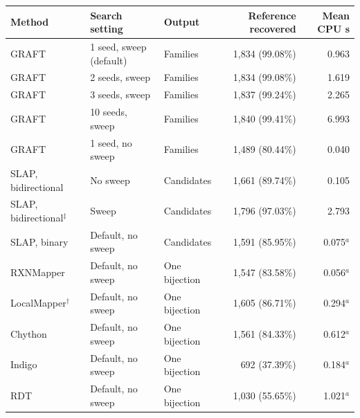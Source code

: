 \begin{tabular}{@{}lllr r@{}}\toprule
Method & Search setting & Output & Reference recovered & Mean CPU s\\\midrule
GRAFT & 1 seed, sweep (default) & Families & 1,834 (99.08\%) & 0.963 \\
GRAFT & 2 seeds, sweep & Families & 1,834 (99.08\%) & 1.619 \\
GRAFT & 3 seeds, sweep & Families & 1,837 (99.24\%) & 2.265 \\
GRAFT & 10 seeds, sweep & Families & 1,840 (99.41\%) & 6.993 \\
GRAFT & 1 seed, no sweep & Families & 1,489 (80.44\%) & 0.040 \\
SLAP, bidirectional & No sweep & Candidates & 1,661 (89.74\%) & 0.105 \\
SLAP, bidirectional$^{\ddagger}$ & Sweep & Candidates & 1,796 (97.03\%) & 2.793 \\
SLAP, binary & Default, no sweep & Candidates & 1,591 (85.95\%) & 0.075$^{a}$ \\
RXNMapper & Default, no sweep & One bijection & 1,547 (83.58\%) & 0.056$^{a}$ \\
LocalMapper$^{\dagger}$ & Default, no sweep & One bijection & 1,605 (86.71\%) & 0.294$^{a}$ \\
Chython & Default, no sweep & One bijection & 1,561 (84.33\%) & 0.612$^{a}$ \\
Indigo & Default, no sweep & One bijection & 692 (37.39\%) & 0.184$^{a}$ \\
RDT & Default, no sweep & One bijection & 1,030 (55.65\%) & 1.021$^{a}$ \\
\bottomrule\end{tabular}
